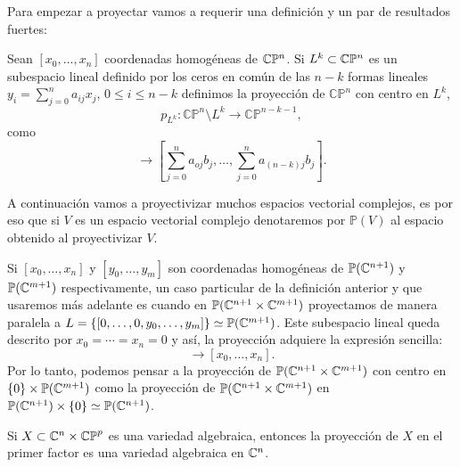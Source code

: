 Para empezar a proyectar vamos a requerir una definición y un par de resultados fuertes:

\begin{defn}
\label{Def:ProyeccionProyectiva}
Sean $[x_{0},\ldots,x_{n}]$ coordenadas homogéneas de $\mathbb{C}\mathbb{P}^{n}$. Si $L^{k}\subset\mathbb{C}\mathbb{P}^{n}$ es un subespacio lineal definido por los ceros en común de las $n-k$ formas lineales $y_{i}=\sum_{j=0}^{n} a_{ij}x_{j}$, $0\leq i\leq n-k$ definimos la proyección de $\mathbb{CP}^{n}$ con centro en $L^{k}$,
\begin{equation*}
p_{L^{k}}\colon \mathbb{CP}^{n}\setminus L^{k}\rightarrow\mathbb{CP}^{n-k-1},
\end{equation*}
como
\begin{equation*}
[b_{0},\ldots,b_{n}]\rightarrow[\sum_{j=0}^{n} a_{oj}b_{j},\ldots,\sum_{j=0}^{n} a_{(n-k)j}b_{j}].
\end{equation*}
\end{defn}

A continuación vamos a proyectivizar muchos espacios vectorial complejos, es por eso que si $V$ es un espacio vectorial complejo denotaremos por $\mathbb{P}(V)$ al espacio obtenido al proyectivizar $V$.

\begin{Ejemplo}
\label{Ej:ProyeccionCanonica}
Si $[x_{0},\ldots,x_{n}]$ y $[y_{0},\ldots,y_{m}]$ son coordenadas homogéneas de $\mathbb{P}(\mathbb{C}^{n+1})$ y $\mathbb{P}(\mathbb{C}^{m+1})$ respectivamente, un caso particular de la definición anterior y que usaremos más adelante es cuando en $\mathbb{P}(\mathbb{C}^{n+1}\times\mathbb{C}^{m+1})$ proyectamos de manera paralela a $L=\{ [0,\ldots,0,y_{0},\ldots,y_{m}] \}\simeq\mathbb{P}(\mathbb{C}^{m+1})$. Este subespacio lineal queda descrito por $x_{0}=\cdots=x_{n}=0$ y así, la proyección adquiere la expresión sencilla:
\begin{equation*}
[x_{0},\ldots,x_{n},y_{0},\ldots,y_{m}]\rightarrow [x_{0},\ldots,x_{n}].
\end{equation*}
Por lo tanto, podemos pensar a la proyección de $\mathbb{P}(\mathbb{C}^{n+1}\times\mathbb{C}^{m+1})$ con centro en $\{0\}\times\mathbb{P}(\mathbb{C}^{m+1})$ como la proyección de $\mathbb{P}(\mathbb{C}^{n+1}\times\mathbb{C}^{m+1})$ en $\mathbb{P}(\mathbb{C}^{n+1})\times\{0\}\simeq\mathbb{P}(\mathbb{C}^{n+1})$.  
\end{Ejemplo}

\begin{Teorema}
\label{Teo:CompacidadProyectiva}
Si $X\subset\mathbb{C}^{n}\times\mathbb{CP}^{p}$ es una variedad algebraica, entonces la proyección de $X$ en el primer factor es una variedad algebraica en $\mathbb{C}^{n}$.
\end{Teorema}

